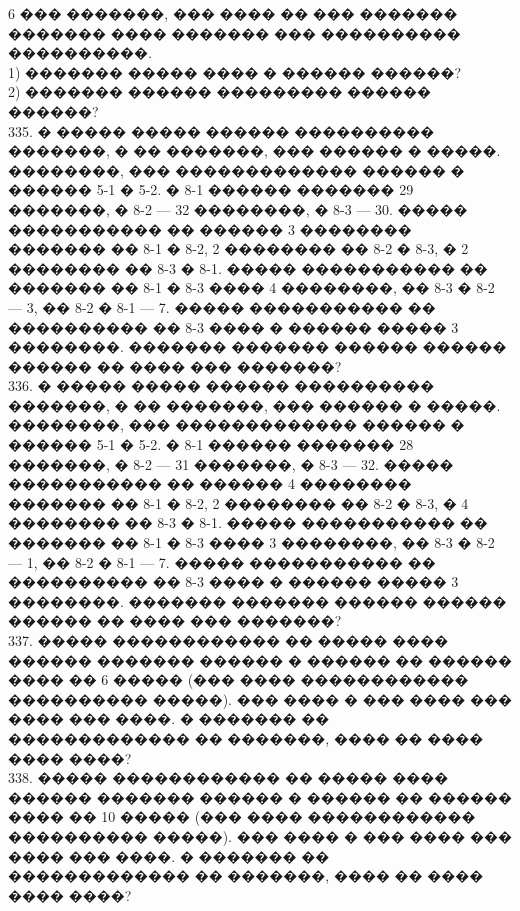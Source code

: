 \documentclass[12pt]{article}
\begin{document}
6 ��� �������, ��� ���� �� ��� ������� ������� ���� ������� ��� ���������� ����������.\\
1) ������� ����� ���� � ������ ������?\\
2) ������� ������ ��������� ������ ������?\\
335. � ����� ����� ������ ���������� �������, � �� �������, ��� ������ � �����. ��������, ��� ������������� ������ � ������ 5-1 � 5-2. � 8-1 ������ ������� 29 �������, � 8-2 --- 32 ��������, � 8-3 --- 30. ����� ����������� �� ������ 3 �������� ������� �� 8-1 � 8-2, 2 �������� �� 8-2 � 8-3, � 2 �������� �� 8-3 � 8-1. ����� ����������� �� ������� �� 8-1 � 8-3 ���� 4 ��������, �� 8-3 � 8-2 --- 3, �� 8-2 � 8-1 --- 7. ����� ����������� �� ���������� �� 8-3 ���� � ������ ����� 3 ��������. ������� ������� ������ ������ ������ �� ���� ��� �������?\\
336. � ����� ����� ������ ���������� �������, � �� �������, ��� ������ � �����. ��������, ��� ������������� ������ � ������ 5-1 � 5-2. � 8-1 ������ ������� 28 �������, � 8-2 --- 31 �������, � 8-3 --- 32. ����� ����������� �� ������ 4 �������� ������� �� 8-1 � 8-2, 2 �������� �� 8-2 � 8-3, � 4 �������� �� 8-3 � 8-1. ����� ����������� �� ������� �� 8-1 � 8-3 ���� 3 ��������, �� 8-3 � 8-2 --- 1, �� 8-2 � 8-1 --- 7. ����� ����������� �� ���������� �� 8-3 ���� � ������ ����� 3 ��������. ������� ������� ������ ������ ������ �� ���� ��� �������?\\
337. ����� ������������ �� ����� ���� ������ ������� ������ � ������ �� ������ ���� �� 6 ����� (��� ���� ������������ ���������� �����). ��� ���� � ��� ���� ��� ���� ��� ����. � ������� �� ������������� �� �������, ���� �� ���� ���� ����?\\
338. ����� ������������ �� ����� ���� ������ ������� ������ � ������ �� ������ ���� �� 10 ����� (��� ���� ������������ ���������� �����). ��� ���� � ��� ���� ��� ���� ��� ����. � ������� �� ������������� �� �������, ���� �� ���� ���� ����?
\newpage
\end{document}
